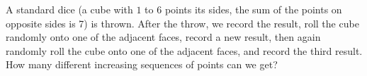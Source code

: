 A standard dice (a cube with $1$ to $6$ points its sides, the sum of the points on opposite sides is 7) is thrown. After the throw, we record the result, roll the cube randomly onto one of the adjacent faces, record a new result, then again randomly roll the cube onto one of the adjacent faces, and record the third result. How many different increasing sequences of points can we get?
